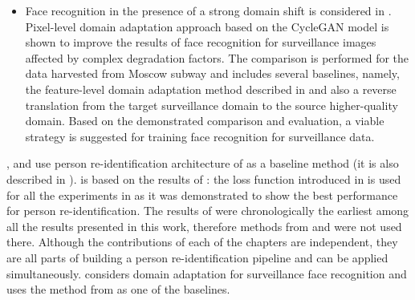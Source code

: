 \begin{itemize}
    \item
    Face recognition in the presence of a strong domain shift is considered in . Pixel-level domain adaptation approach based on the CycleGAN model is shown to improve the results of face recognition for surveillance images affected by complex degradation factors. The comparison is performed for the data harvested from Moscow subway and includes several baselines, namely, the feature-level domain adaptation method described in  and also a reverse translation from the target surveillance domain to the source higher-quality domain. Based on the demonstrated comparison and evaluation, a viable strategy is suggested for training face recognition for surveillance data. 

    
\end{itemize}


,  and  use  person re-identification architecture of \citep{Yi14} as a baseline method (it is also  described in ).   is based on the results of : the loss function introduced in  is used for 
all the experiments in  as it was demonstrated to show the best performance for person re-identification. 
The results of  were chronologically the earliest among all the results presented in this work, therefore  methods  from  and  were not used there. 
Although the contributions of each of the chapters are independent, they are all parts of building a person re-identification pipeline and can be applied simultaneously. 
 considers domain adaptation for surveillance face recognition and uses the method from  as one of the baselines.
 

